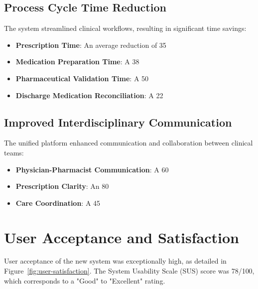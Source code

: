 \subsection{Process Cycle Time Reduction}

The system streamlined clinical workflows, resulting in significant time savings:
\begin{itemize}
    \item \textbf{Prescription Time}: An average reduction of 35%
    \item \textbf{Medication Preparation Time}: A 38%
    \item \textbf{Pharmaceutical Validation Time}: A 50%
    \item \textbf{Discharge Medication Reconciliation}: A 22%
\end{itemize}

\subsection{Improved Interdisciplinary Communication}

The unified platform enhanced communication and collaboration between clinical teams:
\begin{itemize}
    \item \textbf{Physician-Pharmacist Communication}: A 60%
    \item \textbf{Prescription Clarity}: An 80%
    \item \textbf{Care Coordination}: A 45%
\end{itemize}

\section{User Acceptance and Satisfaction}

User acceptance of the new system was exceptionally high, as detailed in Figure~\ref{fig:user-satisfaction}. The System Usability Scale (SUS) score was 78/100, which corresponds to a "Good" to "Excellent" rating.

